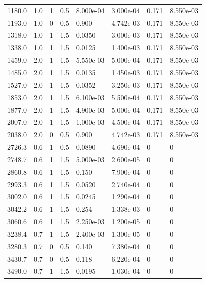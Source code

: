\documentclass[preview]{standalone}
\begin{document}
{{\begin{tabular}{L{1.2cm}C{1.2cm} C{0.3cm}C{0.5cm} C{1.4cm}C{1.4cm} C{1.4cm}C{1.4cm}}
  1180.0  &   1.0  & 1     & 0.5 &  8.000e-04  & 3.000e-04  & 0.171 &  8.550e-03   \\ 
  1193.0  &   1.0  & 0     & 0.5 &  0.900  & 4.742e-03  & 0.171 &  8.550e-03   \\ 
  1318.0  &   1.0  & 1     & 1.5 &  0.0350  & 3.000e-03  & 0.171 &  8.550e-03   \\ 
  1338.0  &   1.0  & 1     & 1.5 &  0.0125  & 1.400e-03  & 0.171 &  8.550e-03   \\ 
  1459.0  &   2.0  & 1     & 1.5 &  5.550e-03  & 5.000e-04  & 0.171 &  8.550e-03   \\ 
  1485.0  &   2.0  & 1     & 1.5 &  0.0135  & 1.450e-03  & 0.171 &  8.550e-03   \\ 
  1527.0  &   2.0  & 1     & 1.5 &  0.0352  & 3.250e-03  & 0.171 &  8.550e-03   \\ 
  1853.0  &   2.0  & 1     & 1.5 &  6.100e-03  & 5.500e-04  & 0.171 &  8.550e-03   \\ 
  1877.0  &   2.0  & 1     & 1.5 &  4.900e-03  & 5.000e-04  & 0.171 &  8.550e-03   \\ 
  2007.0  &   2.0  & 1     & 1.5 &  1.000e-03  & 4.500e-04  & 0.171 &  8.550e-03   \\ 
  2038.0  &   2.0  & 0     & 0.5 &  0.900  & 4.742e-03  & 0.171 &  8.550e-03   \\ 
  2726.3  &   0.6  & 1     & 0.5 &  0.0890  & 4.690e-04  & 0 &  0   \\ 
  2748.7  &   0.6  & 1     & 1.5 &  5.000e-03  & 2.600e-05  & 0 &  0   \\ 
  2860.8  &   0.6  & 1     & 1.5 &  0.150  & 7.900e-04  & 0 &  0   \\ 
  2993.3  &   0.6  & 1     & 1.5 &  0.0520  & 2.740e-04  & 0 &  0   \\ 
  3002.0  &   0.6  & 1     & 1.5 &  0.0245  & 1.290e-04  & 0 &  0   \\ 
  3042.2  &   0.6  & 1     & 1.5 &  0.254  & 1.338e-03  & 0 &  0   \\ 
  3060.6  &   0.6  & 1     & 1.5 &  2.250e-03  & 1.200e-05  & 0 &  0   \\ 
  3238.4  &   0.7  & 1     & 1.5 &  2.400e-03  & 1.300e-05  & 0 &  0   \\ 
  3280.3  &   0.7  & 0     & 0.5 &  0.140  & 7.380e-04  & 0 &  0   \\ 
  3430.7  &   0.7  & 0     & 0.5 &  0.118  & 6.220e-04  & 0 &  0   \\ 
  3490.0  &   0.7  & 1     & 1.5 &  0.0195  & 1.030e-04  & 0 &  0   \\ 

\end{tabular}}}
\end{document}
